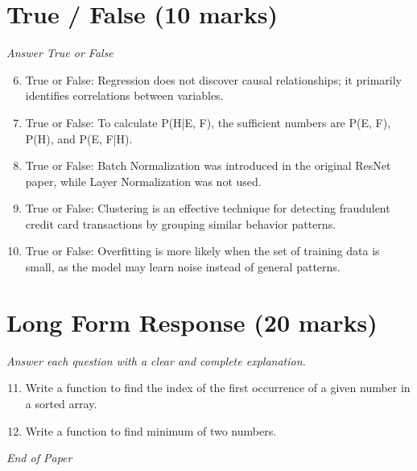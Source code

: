 \documentclass[12pt]{article}
\begin{document}
\section*{True / False (10 marks)}
\textit{Answer True or False}
\begin{enumerate}[label=\arabic*.]
\setcounter{enumi}{5}
\item True or False: Regression does not discover causal relationships; it primarily identifies correlations between variables.
\item True or False: To calculate P(H|E, F), the sufficient numbers are P(E, F), P(H), and P(E, F|H).
\item True or False: Batch Normalization was introduced in the original ResNet paper, while Layer Normalization was not used.
\item True or False: Clustering is an effective technique for detecting fraudulent credit card transactions by grouping similar behavior patterns.
\item True or False: Overfitting is more likely when the set of training data is small, as the model may learn noise instead of general patterns.
\end{enumerate}

\section*{Long Form Response (20 marks)}
\textit{Answer each question with a clear and complete explanation.}
\begin{enumerate}[label=\arabic*.]
\setcounter{enumi}{10}
\item Write a function to find the index of the first occurrence of a given number in a sorted array.
\item Write a function to find minimum of two numbers.
\end{enumerate}

\vfill
\noindent\textit{End of Paper}
\end{document}
